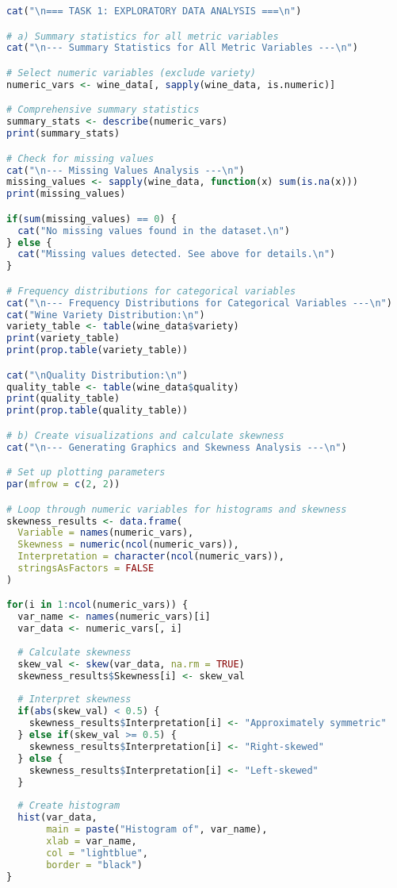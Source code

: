 \begin{lstlisting}[language=R, caption=Complete Wine Analysis R Script, breaklines=true]
cat("\n=== TASK 1: EXPLORATORY DATA ANALYSIS ===\n")

# a) Summary statistics for all metric variables
cat("\n--- Summary Statistics for All Metric Variables ---\n")

# Select numeric variables (exclude variety)
numeric_vars <- wine_data[, sapply(wine_data, is.numeric)]

# Comprehensive summary statistics
summary_stats <- describe(numeric_vars)
print(summary_stats)

# Check for missing values
cat("\n--- Missing Values Analysis ---\n")
missing_values <- sapply(wine_data, function(x) sum(is.na(x)))
print(missing_values)

if(sum(missing_values) == 0) {
  cat("No missing values found in the dataset.\n")
} else {
  cat("Missing values detected. See above for details.\n")
}

# Frequency distributions for categorical variables
cat("\n--- Frequency Distributions for Categorical Variables ---\n")
cat("Wine Variety Distribution:\n")
variety_table <- table(wine_data$variety)
print(variety_table)
print(prop.table(variety_table))

cat("\nQuality Distribution:\n")
quality_table <- table(wine_data$quality)
print(quality_table)
print(prop.table(quality_table))

# b) Create visualizations and calculate skewness
cat("\n--- Generating Graphics and Skewness Analysis ---\n")

# Set up plotting parameters
par(mfrow = c(2, 2))

# Loop through numeric variables for histograms and skewness
skewness_results <- data.frame(
  Variable = names(numeric_vars),
  Skewness = numeric(ncol(numeric_vars)),
  Interpretation = character(ncol(numeric_vars)),
  stringsAsFactors = FALSE
)

for(i in 1:ncol(numeric_vars)) {
  var_name <- names(numeric_vars)[i]
  var_data <- numeric_vars[, i]
  
  # Calculate skewness
  skew_val <- skew(var_data, na.rm = TRUE)
  skewness_results$Skewness[i] <- skew_val
  
  # Interpret skewness
  if(abs(skew_val) < 0.5) {
    skewness_results$Interpretation[i] <- "Approximately symmetric"
  } else if(skew_val >= 0.5) {
    skewness_results$Interpretation[i] <- "Right-skewed"
  } else {
    skewness_results$Interpretation[i] <- "Left-skewed"
  }
  
  # Create histogram
  hist(var_data, 
       main = paste("Histogram of", var_name),
       xlab = var_name,
       col = "lightblue",
       border = "black")
}


\end{lstlisting}
